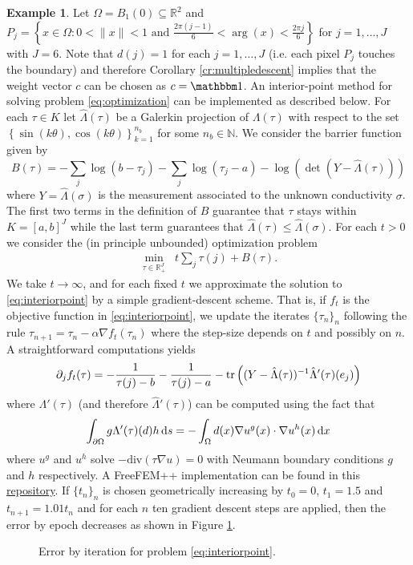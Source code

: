 \documentclass{article}
\theoremstyle{definition}
\newtheorem{example}[theorem]{Example}
\theoremstyle{remark}
\renewcommand{\leq}{\leqslant}
\newcommand{\ones}{\mathbbm1}
\newcommand{\tr}[1]{\textup{tr}\left(#1\right)}
\begin{document}
\begin{example}\label{ex:ones}
Let $\Omega = B_1(0)\subseteq \mathbb R^2$ and $P_j =\left\{ x\in \Omega : 0 < \|x\| < 1 \text{ and } \frac{2\pi(j-1)}{6} < \arg(x) < \frac{2\pi j}{6} \right\}$ for $j=1,\dots,J$ with $J=6$.
Note that $d(j)=1$ for each $j=1,\dots,J$ (i.e. each pixel $P_j$ touches the boundary) and therefore Corollary \ref{cr:multipledescent} implies that the weight vector $c$ can be chosen as $c = \ones$.
An interior-point method for solving problem \ref{eq:optimization} can be implemented as described below.
For each $\tau\in K$ let $\hat\Lambda(\tau)$ be a Galerkin projection of $\Lambda(\tau)$ with respect to the set $\left\{ \sin(k\theta),\cos(k\theta)\right\}_{k=1}^{n_b}$ for some $n_b\in\mathbb N$.
We consider the barrier function given by
$$ B(\tau) = -\sum_j\log(b-\tau_j) -\sum_j\log(\tau_j-a) - \log(\det(Y-\hat\Lambda(\tau))) $$
where $Y = \hat\Lambda(\sigma)$ is the measurement associated to the unknown conductivity $\sigma$.
The first two terms in the definition of $B$ guarantee that $\tau$ stays within $K =[a,b]^J$ while the last term guarantees that $\hat\Lambda(\tau)\leq\hat\Lambda(\sigma)$.
For each $t>0$ we consider the (in principle unbounded) optimization problem
\begin{align}
\min_{\tau\in\mathbb R^J_+}\;\; t\sum_j \tau(j) + B(\tau). \label{eq:interiorpoint}
\end{align}
We take $t\to\infty$, and for each fixed $t$ we approximate the solution to \eqref{eq:interiorpoint} by a simple gradient-descent scheme.
That is, if $f_t$ is the objective function in \eqref{eq:interiorpoint}, we update the iterates $\{\tau_n\}_n$ following the rule $\tau_{n+1}=\tau_n - \alpha \nabla f_t(\tau_n)$ where the step-size depends on $t$ and possibly on $n$.
A straightforward computations yields
$$
\partial_j f_t(\tau) = -\frac{1}{\tau(j)-b} - \frac{1}{\tau(j)-a} - \tr{(Y-\hat\Lambda(\tau))^{-1}\hat\Lambda'(\tau)(e_j)}
$$
where $\Lambda'(\tau)$ (and therefore $\hat\Lambda'(\tau)$) can be computed using the fact that
$$
\int_{\partial\Omega}g\Lambda'(\tau)(d)h\,\text ds = -\int_\Omega d(x)\nabla u^g(x) \cdot \nabla u^h(x) \,\text dx
$$
where $u^g$ and $u^h$ solve $-\text{div}(\tau\nabla u) = 0$ with Neumann boundary conditions $g$ and $h$ respectively.
A FreeFEM++ \cite{freefem} implementation can be found in this \href{https://github.com/jcvillaquira/convex-calderon}{repository}.
If $\{t_n\}_n$ is chosen geometrically increasing by $t_0=0$, $t_1=1.5$ and $t_{n+1} = 1.01 t_n$ and for each $n$ ten gradient descent steps are applied, then the error by epoch decreases as shown in Figure \ref{fig:convexerror}.
\begin{figure}[H]
\centering

\caption{Error by iteration for problem \eqref{eq:interiorpoint}.}
\label{fig:convexerror}
\end{figure}
\end{example}
\end{document}
